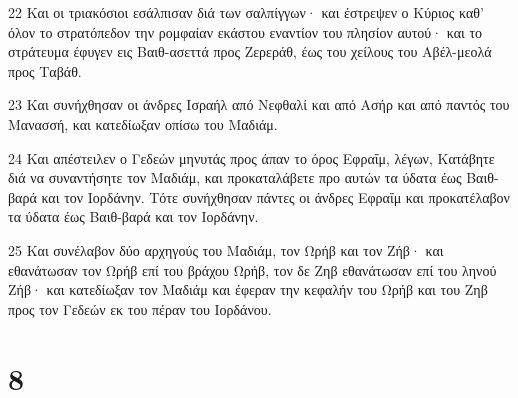 \par 22 Και οι τριακόσιοι εσάλπισαν διά των σαλπίγγων· και έστρεψεν ο Κύριος καθ' όλον το στρατόπεδον την ρομφαίαν εκάστου εναντίον του πλησίον αυτού· και το στράτευμα έφυγεν εις Βαιθ-ασεττά προς Ζερεράθ, έως του χείλους του Αβέλ-μεολά προς Ταβάθ.
\par 23 Και συνήχθησαν οι άνδρες Ισραήλ από Νεφθαλί και από Ασήρ και από παντός του Μανασσή, και κατεδίωξαν οπίσω του Μαδιάμ.
\par 24 Και απέστειλεν ο Γεδεών μηνυτάς προς άπαν το όρος Εφραΐμ, λέγων, Κατάβητε διά να συναντήσητε τον Μαδιάμ, και προκαταλάβετε προ αυτών τα ύδατα έως Βαιθ-βαρά και τον Ιορδάνην. Τότε συνήχθησαν πάντες οι άνδρες Εφραΐμ και προκατέλαβον τα ύδατα έως Βαιθ-βαρά και τον Ιορδάνην.
\par 25 Και συνέλαβον δύο αρχηγούς του Μαδιάμ, τον Ωρήβ και τον Ζήβ· και εθανάτωσαν τον Ωρήβ επί του βράχου Ωρήβ, τον δε Ζηβ εθανάτωσαν επί του ληνού Ζήβ· και κατεδίωξαν τον Μαδιάμ και έφεραν την κεφαλήν του Ωρήβ και του Ζηβ προς τον Γεδεών εκ του πέραν του Ιορδάνου.

\chapter{8}

